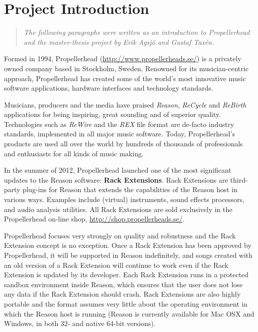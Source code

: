 \chapter* {Project Introduction}

\begin {quote}
    \emph {The following paragraphs were written as an introduction to
           Propellerhead and the master-thesis project by Erik Agsjö and Gustaf
           Taxén.}
\end {quote}

Formed in 1994, Propellerhead (\url {http://www.propellerheads.se/}) is a
privately owned company based in Stockholm, Sweden.
Renowned for its musician-centric approach, Propellerhead has created some of
the world's most innovative music software applications, hardware interfaces and
technology standards.

Musicians, producers and the media have praised \emph{Reason}, \emph{ReCycle}
and \emph{ReBirth} applications for being inspiring, great sounding and of
superior quality.
Technologies such as \emph{ReWire} and the \emph{REX} file format are de-facto
industry standards, implemented in all major music software.
Today, Propellerhead’s products are used all over the world by hundreds of
thousands of professionals and enthusiasts for all kinds of music making.

In the summer of 2012, Propellerhead launched one of the most significant
updates to the Reason software: \textbf {Rack Extensions}.
Rack Extensions are third-party plug-ins for Reason that extends the
capabilities of the Reason host in various ways.
Examples include (virtual) instruments, sound effects processors, and audio
analysis utilities.
All Rack Extensions are sold exclusively in the Propellerhead on-line shop,
\url{http://shop.propellerheads.se/}.

Propellerhead focuses very strongly on quality and robustness and the Rack
Extension concept is no exception.
Once a Rack Extension has been approved by Propellerhead, it will be supported
in Reason indefinitely, and songs created with an old version of a Rack
Extension will continue to work even if the Rack Extension is updated by its
developer.
Each Rack Extension runs in a protected sandbox environment inside Reason, which
ensures that the user does not lose any data if the Rack Extension should crash.
Rack Extensions are also highly portable and the format assumes very little
about the operating environment in which the Reason host is running (Reason is
currently available for Mac OSX and Windows, in both 32- and native 64-bit
versions).

